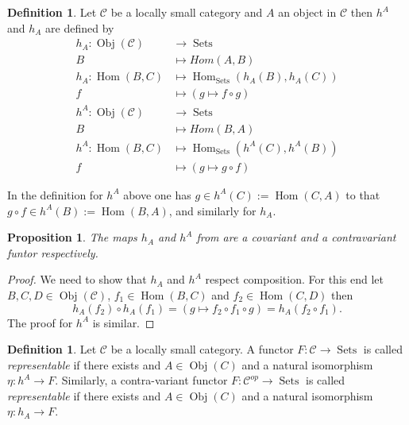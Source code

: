 \documentclass[a4paper,12pt,reqno]{amsart}
\DeclareMathOperator{\Sets}{Sets}
\DeclareMathOperator{\Hom}{Hom}
\DeclareMathOperator{\Obj}{Obj}
\newtheorem{proposition}[lemma]{Proposition}
\theoremstyle{definition}
\newtheorem{definition}[lemma]{Definition}
\numberwithin{lemma}{section}
\numberwithin{equation}{section}
\numberwithin{figure}{section}
\begin{document}
\begin{definition}\label{def:hom-functor}
Let $\mathcal C$ be a locally small category and $A$ an object in  $\mathcal C$ then $h^A$  and $h_A$ are defined by
\begin{align*}
h_A : \Obj(\mathcal C) &\to \Sets \\
B &\mapsto Hom(A,B)  \\
h_A : \Hom(B,C)  & \mapsto \Hom_{\Sets}(h_A(B),h_A(C)) \\
f &\mapsto (g \mapsto f \circ g) \\
h^A : \Obj(\mathcal C) &\to \Sets \\
         B &\mapsto Hom(B,A)  \\
h^A : \Hom(B,C)  & \mapsto \Hom_{\Sets}(h^A(C),h^A(B)) \\
             f &\mapsto (g \mapsto  g \circ f)
\end{align*}

\end{definition}
In the definition for $h^A$ above one has $g \in h^A(C) :=\Hom(C,A)$ to that $g \circ f \in h^A(B) :=\Hom(B,A)$, and similarly for $h_A$.

\begin{proposition}
The maps $h_A$ and $h^A$ from  are a covariant and a contravariant funtor respectively. 
\end{proposition}
\begin{proof}
We need to show that $h_A$ and $h^A$ respect composition. For this end let $B,C,D \in \Obj(\mathcal C)$, $f_1 \in \Hom(B,C)$ and $f_2 \in \Hom(C,D)$ then 
$$h_A(f_2) \circ h_A(f_1) = (g \mapsto f_2 \circ f_1 \circ g) = h_A(f_2 \circ f_1).$$ 
The proof for $h^A$ is similar.
\end{proof}

\begin{definition}\label{def:representable-functor}
Let $\mathcal C$ be a locally small category. A functor $F: \mathcal C \to \Sets$ is called \textit{representable} if there exists and $A \in \Obj(C)$ and a natural isomorphism $\eta: h^A \to F$.  Similarly, a contra-variant functor $F: \mathcal C ^{op} \to \Sets$ is called \textit{representable} if there exists and $A \in \Obj(C)$ and a natural isomorphism $\eta: h_A \to F$.  
\end{definition}
\end{document}
